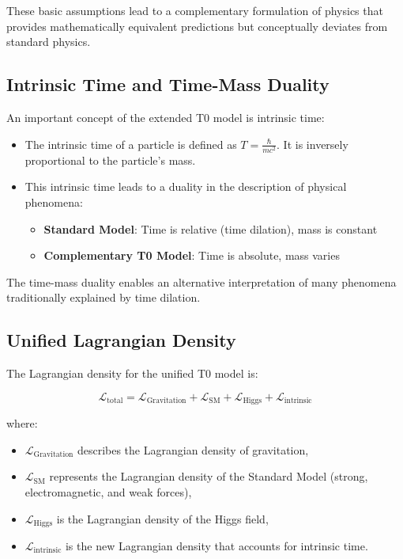 \documentclass[a4paper,12pt]{article}
\theoremstyle{definition}
\theoremstyle{remark}
\begin{document}
	These basic assumptions lead to a complementary formulation of physics that provides mathematically equivalent predictions but conceptually deviates from standard physics.
	
	\subsection{Intrinsic Time and Time-Mass Duality}
	
	An important concept of the extended T0 model is intrinsic time:
	
	\begin{itemize}
		\item The intrinsic time of a particle is defined as $T = \frac{\hbar}{mc^2}$. It is inversely proportional to the particle's mass.
		\item This intrinsic time leads to a duality in the description of physical phenomena:
		\begin{itemize}
			\item \textbf{Standard Model}: Time is relative (time dilation), mass is constant
			\item \textbf{Complementary T0 Model}: Time is absolute, mass varies
		\end{itemize}
	\end{itemize}
	
	The time-mass duality enables an alternative interpretation of many phenomena traditionally explained by time dilation.
	
	\subsection{Unified Lagrangian Density}
	
	The Lagrangian density for the unified T0 model is:
	
	\begin{equation}
		\mathcal{L}_\text{total} = \mathcal{L}_\text{Gravitation} + \mathcal{L}_\text{SM} + \mathcal{L}_\text{Higgs} + \mathcal{L}_\text{intrinsic}
	\end{equation}
	
	where:
	\begin{itemize}
		\item $\mathcal{L}_\text{Gravitation}$ describes the Lagrangian density of gravitation,
		\item $\mathcal{L}_\text{SM}$ represents the Lagrangian density of the Standard Model (strong, electromagnetic, and weak forces),
		\item $\mathcal{L}_\text{Higgs}$ is the Lagrangian density of the Higgs field,
		\item $\mathcal{L}_\text{intrinsic}$ is the new Lagrangian density that accounts for intrinsic time.
	\end{itemize}
	
\end{document}
